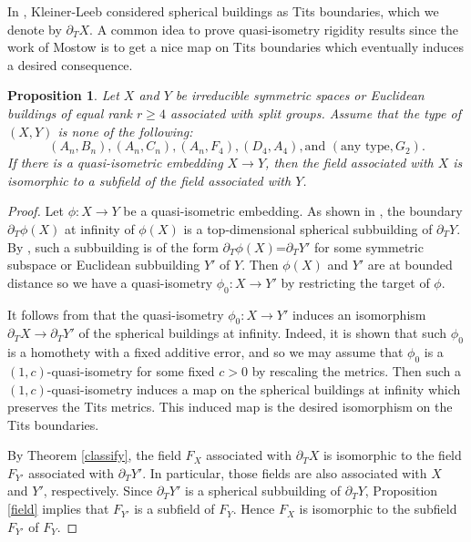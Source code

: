 \documentclass[letterpaper, reqno, 11pt]{amsart}
\newtheorem{prop}[theorem]{Proposition}
\theoremstyle{definition}
\theoremstyle{definition}
\theoremstyle{remark}
\begin{document}
In \cite{kleiner1997rigidity}, Kleiner-Leeb considered spherical buildings as Tits boundaries, which we denote by $\partial_T X$.
A common idea to prove quasi-isometry rigidity results since the work of Mostow is to get a nice map on Tits boundaries which eventually induces a desired consequence. 



\begin{prop}\label{1} 
    Let $X$ and $Y$ be irreducible symmetric spaces or Euclidean buildings of  equal rank $r \geq 4$ associated with split groups. Assume that the type of $(X,Y)$ is none of the following: 
    \[
    (A_n,B_n), (A_n,C_n), (A_n,F_4), (D_4, A_4), \text{and }(\text{any type},G_2).
    \]
   If there is a quasi-isometric embedding $X \to Y$, then the field associated with $X$ is isomorphic to a subfield of the field associated with $Y$. 
\end{prop} 


\begin{proof}
    Let $\phi:X \rightarrow Y$ be a quasi-isometric embedding. 
    As shown in \cite [Proof of Theorem 1.8]{fisher2018quasi}, the boundary $\partial_T \phi(X)$ at infinity of $\phi(X)$  is a top-dimensional spherical subbuilding of $\partial_T Y$. 
    By \cite [Theorem 3.1] {kleiner2006rigidity}, such a subbuilding is of the form $\partial_T \phi(X)$=$\partial_T Y'$ for some symmetric subspace or Euclidean subbuilding $Y'$ of $Y$. 
    Then $\phi(X)$ and $Y'$ are at bounded distance so we have a quasi-isometry $\phi_0: X \to Y'$ by restricting the target of $\phi$.

    It follows from \cite[Proof of Theorem 1.1.3]{kleiner1997rigidity} that 
    the quasi-isometry $\phi_0: X \to Y'$ induces an isomorphism 
    $\partial_T X \to \partial_T Y'$ of the spherical buildings at infinity. Indeed, it is shown that such $\phi_0$ is a homothety with a fixed additive error, and so we may assume that $\phi_0$ is a $(1,c)$-quasi-isometry for some fixed $c>0$ by rescaling the metrics. Then such a $(1,c)$-quasi-isometry induces a map on the spherical buildings at infinity which preserves the Tits metrics. This induced map is the desired isomorphism on the Tits boundaries.
    
    By Theorem \ref{classify}, the field $F_X$ associated with $\partial_T X$ is isomorphic to the field $F_{Y'}$ associated with $\partial_T Y'$. In particular, those fields are also associated with $X$ and $Y'$, respectively. Since $\partial_T Y'$ is a spherical subbuilding of $\partial_T Y$, Proposition \ref{field} implies that $F_{Y'}$ is a subfield of $F_Y$. Hence $F_X$ is isomorphic to the subfield $F_{Y'}$ of $F_Y$.
\end{proof}
\end{document}
